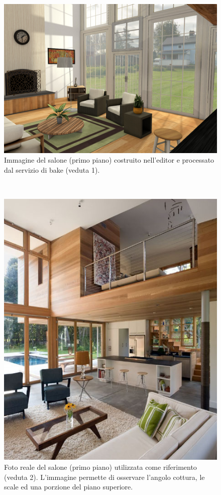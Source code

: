 \\
\begin{figure}[htb]
 \centering
 \includegraphics[width=1\linewidth]{images/chapter_prove_sperimentali/scena1_bake.png}\hfill
 \caption[Ambiente virtuale: Salone primo piano, veduta 1]{Immagine del salone (primo piano) costruito nell'editor e processato dal servizio di bake (veduta 1).}
 \label{fig:prove_sperimentali_qualita_visiva_scena1_bake}
\end{figure}
\\
\begin{figure}[htb]
 \centering
 \includegraphics[width=1\linewidth]{images/chapter_prove_sperimentali/scena2_reale.jpg}\hfill
 \caption[Ambiente reale: Salone primo piano, veduta 2]{Foto reale del salone (primo piano) utilizzata come riferimento (veduta 2). L'immagine permette di osservare l'angolo cottura, le scale ed una porzione del piano superiore.}
 \label{fig:prove_sperimentali_qualita_visiva_scena2_reale}
\end{figure}

